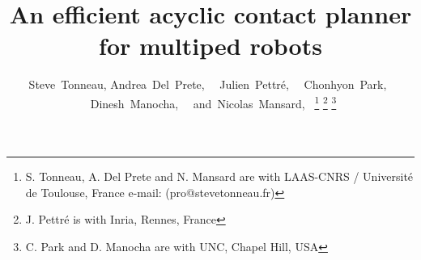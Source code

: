 \documentclass[journal]{IEEEtran}
\begin{document}
%
\title{An efficient acyclic contact planner for multiped robots}
%
%
%

\author{Steve~Tonneau,
        Andrea~Del~Prete,~
        ~Julien~Pettr\'e,~
        ~Chonhyon~Park,~
        ~Dinesh~Manocha,~
        ~and~Nicolas~Mansard,~%
\thanks{S. Tonneau, A. Del Prete and N. Mansard are with LAAS-CNRS / Universit\'e de Toulouse, France e-mail: (pro@stevetonneau.fr)}%
\thanks{J. Pettr\'e is with Inria, Rennes, France}%
\thanks{C. Park and D. Manocha are with UNC, Chapel Hill, USA}}

% 
%
\end{document}
